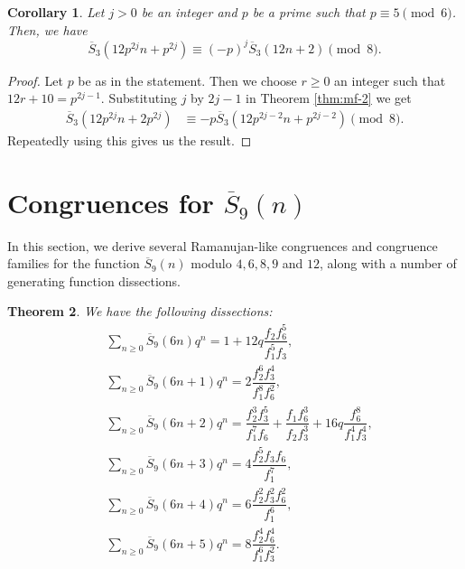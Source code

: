 \documentclass[12pt]{amsart}
\newcommand{\sst}{\overline{S}}
\theoremstyle{plain}
\newtheorem{theorem}{Theorem}[section]
\newtheorem{corollary}[theorem]{Corollary}
\theoremstyle{definition}
\begin{document}
\begin{corollary}
    Let $j>0$ be an integer and $p$ be a prime such that $p\equiv 5\pmod6$. Then, we have
    \[
    \sst_3(12p^{2j}n+p^{2j})\equiv (-p)^j\sst_3(12n+2)\pmod8.
    \]
\end{corollary}


\begin{proof}
    Let $p$ be as in the statement. Then we choose $r\geq 0$ an integer such that $12r+10=p^{2j-1}$. Substituting $j$ by $2j-1$ in Theorem \ref{thm:mf-2} we get
    \begin{align*}
        \sst_3(12p^{2j}n+2p^{2j})&\equiv -p\sst_3(12p^{2j-2}n+p^{2j-2}) \pmod 8.
    \end{align*}
    Repeatedly using this gives us the result.
\end{proof}




\section{Congruences for $\overline{S}_{9}(n)$} \label{sec3}
In this section, we derive several Ramanujan-like congruences and congruence families for the function $\overline{S}_{9}(n)$ modulo $4,6,8,9$ and $12$, along with a number of generating function dissections.

\begin{theorem} \label{thm7} We have the following dissections:
\begin{align}
&\sum_{n\geq 0} \overline{S}_{9}(6n) q^{n}=  1 + 12q \dfrac{f_{2} f_{6}^{5}}{f_{1}^{5} f_{3}}, \label{dis1}\\
&\sum_{n\geq 0} \overline{S}_{9}(6n+1) q^{n}=  2\dfrac{f_{2}^{6} f_{3}^{4}}{f_{1}^{8} f_{6}^{2}},  \label{dis2}\\
&\sum_{n\geq 0} \overline{S}_{9}(6n+2) q^{n}=  \dfrac{f_{2}^{3} f_{3}^{5}}{f_{1}^{7} f_{6}} + \dfrac{f_{1} f_{6}^{3}}{f_{2} f_{3}^{3}} + 16q \dfrac{f_{6}^{8}}{f_{1}^{4} f_{3}^{4}},  \label{dis3}\\
&\sum_{n\geq 0} \overline{S}_{9}(6n+3) q^{n}=  4\dfrac{f_{2}^{5} f_{3} f_{6}}{f_{1}^{7}}, \label{dis4}\\
&\sum_{n\geq 0} \overline{S}_{9}(6n+4) q^{n}=  6\dfrac{f_{2}^{2} f_{3}^{2} f_{6}^{2}}{f_{1}^{6}}, \label{dis5}\\
&\sum_{n\geq 0} \overline{S}_{9}(6n+5) q^{n}=  8\dfrac{f_{2}^{4} f_{6}^{4}}{f_{1}^{6} f_{3}^{2}}. \label{dis6}
\end{align}
\end{theorem}
\end{document}

